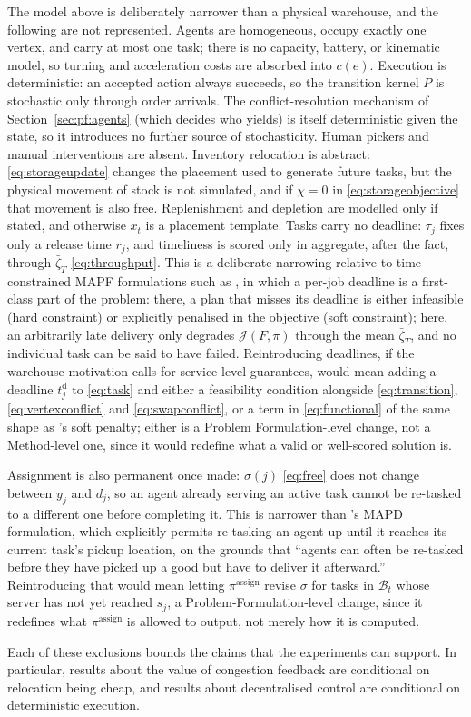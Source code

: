 \documentclass[../main.tex]{subfiles}
\begin{document}
The model above is deliberately narrower than a physical warehouse, and the
following are not represented. Agents are homogeneous, occupy exactly one vertex,
and carry at most one task; there is no capacity, battery, or kinematic model, so
turning and acceleration costs are absorbed into $c(e)$. Execution is
deterministic: an accepted action always succeeds, so the transition kernel $P$
is stochastic only through order arrivals. The conflict-resolution mechanism of %
Section~\ref{sec:pf:agents} (which decides who yields) is itself deterministic
given the state, so it introduces no further source of stochasticity. Human
pickers and manual interventions are absent. Inventory relocation is abstract:
\eqref{eq:storageupdate} changes the placement used to generate future tasks, but
the physical movement of stock is not simulated, and if $\chi = 0$ in
\eqref{eq:storageobjective} that movement is also free. Replenishment and
depletion are modelled only if stated, and otherwise $x_t$ is a placement
template. Tasks carry no deadline: $\tau_j$ fixes only a release time $r_j$, and %
timeliness is scored only in aggregate, after the fact, through
$\bar{\zeta}_T$ \eqref{eq:throughput}. This is a deliberate narrowing relative to
time-constrained MAPF formulations such as \citet{knippenberg2021}, in which a
per-job deadline is a first-class part of the problem: there, a plan that misses
its deadline is either infeasible (hard constraint) or explicitly penalised in
the objective (soft constraint); here, an arbitrarily late delivery only
degrades $\mathcal{J}(F,\pi)$ through the mean $\bar\zeta_T$, and no individual
task can be said to have failed. Reintroducing deadlines, if the warehouse
motivation calls for service-level guarantees, would mean adding a deadline
$t_j^{\mathrm{d}}$ to \eqref{eq:task} and either a feasibility condition
alongside \eqref{eq:transition}, \eqref{eq:vertexconflict} and \eqref{eq:swapconflict}, or a term in
\eqref{eq:functional} of the same shape as \citet{knippenberg2021}'s soft
penalty; either is a Problem Formulation-level change, not a Method-level one,
since it would redefine what a valid or well-scored solution is.

Assignment is also permanent once made: $\sigma(j)$ \eqref{eq:free} does not %
change between $y_j$ and $d_j$, so an agent already serving an active task
cannot be re-tasked to a different one before completing it. This is
narrower than \citet{ma2017lifelong}'s MAPD formulation, which explicitly
permits re-tasking an agent up until it reaches its current task's pickup
location, on the grounds that ``agents can often be re-tasked before they
have picked up a good but have to deliver it afterward.'' Reintroducing that
would mean letting $\pi^{\mathrm{assign}}$ revise $\sigma$ for tasks in
$\mathcal{B}_t$ whose server has not yet reached $s_j$, a
Problem-Formulation-level change, since it redefines what $\pi^{\mathrm{assign}}$
is allowed to output, not merely how it is computed.

Each of these exclusions bounds the claims that the experiments can support. In
particular, results about the value of congestion feedback are conditional on
relocation being cheap, and results about decentralised control are conditional
on deterministic execution.
\end{document}
